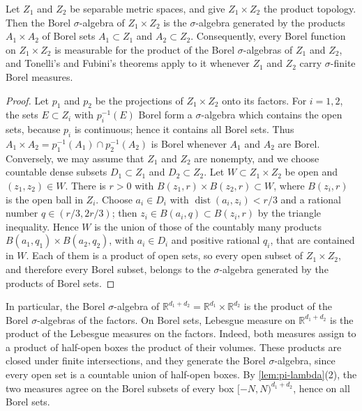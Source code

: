\begin{lemma}\label{lem:borel-product-separable}
Let $Z_1$ and $Z_2$ be separable metric spaces, and give $Z_1\times Z_2$ the product topology. Then the Borel $\sigma$-algebra of $Z_1\times Z_2$ is the $\sigma$-algebra generated by the products $A_1\times A_2$ of Borel sets $A_1\subset Z_1$ and $A_2\subset Z_2$. Consequently, every Borel function on $Z_1\times Z_2$ is measurable for the product of the Borel $\sigma$-algebras of $Z_1$ and $Z_2$, and Tonelli's and Fubini's theorems apply to it whenever $Z_1$ and $Z_2$ carry $\sigma$-finite Borel measures.
\end{lemma}
\begin{proof}
Let $p_1$ and $p_2$ be the projections of $Z_1\times Z_2$ onto its factors. For $i=1,2$, the sets $E\subset Z_i$ with $p_i^{-1}(E)$ Borel form a $\sigma$-algebra which contains the open sets, because $p_i$ is continuous; hence it contains all Borel sets. Thus $A_1\times A_2=p_1^{-1}(A_1)\cap p_2^{-1}(A_2)$ is Borel whenever $A_1$ and $A_2$ are Borel. Conversely, we may assume that $Z_1$ and $Z_2$ are nonempty, and we choose countable dense subsets $D_1\subset Z_1$ and $D_2\subset Z_2$. Let $W\subset Z_1\times Z_2$ be open and $(z_1,z_2)\in W$. There is $r>0$ with $B(z_1,r)\times B(z_2,r)\subset W$, where $B(z_i,r)$ is the open ball in $Z_i$. Choose $a_i\in D_i$ with $\operatorname{dist}(a_i,z_i)<r/3$ and a rational number $q\in(r/3,2r/3)$; then $z_i\in B(a_i,q)\subset B(z_i,r)$ by the triangle inequality. Hence $W$ is the union of those of the countably many products $B(a_1,q_1)\times B(a_2,q_2)$, with $a_i\in D_i$ and positive rational $q_i$, that are contained in $W$. Each of them is a product of open sets, so every open subset of $Z_1\times Z_2$, and therefore every Borel subset, belongs to the $\sigma$-algebra generated by the products of Borel sets.
\end{proof}

In particular, the Borel $\sigma$-algebra of $\mathbb R^{d_1+d_2}=\mathbb R^{d_1}\times\mathbb R^{d_2}$ is the product of the Borel $\sigma$-algebras of the factors. On Borel sets, Lebesgue measure on $\mathbb R^{d_1+d_2}$ is the product of the Lebesgue measures on the factors. Indeed, both measures assign to a product of half-open boxes the product of their volumes. These products are closed under finite intersections, and they generate the Borel $\sigma$-algebra, since every open set is a countable union of half-open boxes. By \cref{lem:pi-lambda}(2), the two measures agree on the Borel subsets of every box $[-N,N)^{d_1+d_2}$, hence on all Borel sets.

